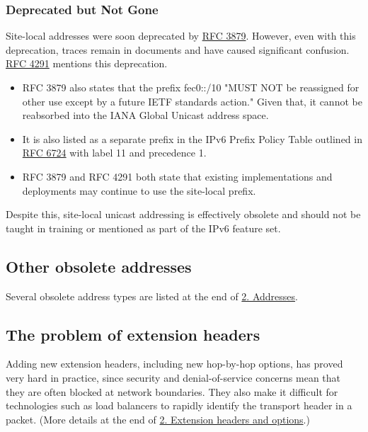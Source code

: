 \documentclass[
]{article}
\providecommand{\tightlist}{%
  \setlength{\itemsep}{0pt}\setlength{\parskip}{0pt}}
\begin{document}
\subsubsection{Deprecated but Not Gone}\label{deprecated-but-not-gone}

Site-local addresses were soon deprecated by
\href{https://www.rfc-editor.org/rfc/rfc3879}{RFC 3879}. However, even
with this deprecation, traces remain in documents and have caused
significant confusion.
\href{https://www.rfc-editor.org/rfc/rfc4291.html\#section-2.5.7}{RFC
4291} mentions this deprecation.

\begin{itemize}
\tightlist
\item
  RFC 3879 also states that the prefix fec0::/10 "MUST NOT be reassigned
  for other use except by a future IETF standards action." Given that,
  it cannot be reabsorbed into the IANA Global Unicast address space.
\item
  It is also listed as a separate prefix in the IPv6 Prefix Policy Table
  outlined in \href{https://www.rfc-editor.org/rfc/rfc6724.html}{RFC
  6724} with label 11 and precedence 1.
\item
  RFC 3879 and RFC 4291 both state that existing implementations and
  deployments may continue to use the site-local prefix.
\end{itemize}

Despite this, site-local unicast addressing is effectively obsolete and
should not be taught in training or mentioned as part of the IPv6
feature set.

\subsection{Other obsolete addresses}\label{other-obsolete-addresses}

Several obsolete address types are listed at the end of
\hyperref[addresses]{2. Addresses}.

\subsection{The problem of extension
headers}\label{the-problem-of-extension-headers}

Adding new extension headers, including new hop-by-hop options, has
proved very hard in practice, since security and denial-of-service
concerns mean that they are often blocked at network boundaries. They
also make it difficult for technologies such as load balancers to
rapidly identify the transport header in a packet. (More details at the
end of \hyperref[extension-headers-and-options]{2. Extension headers and
options}.)
\end{document}
